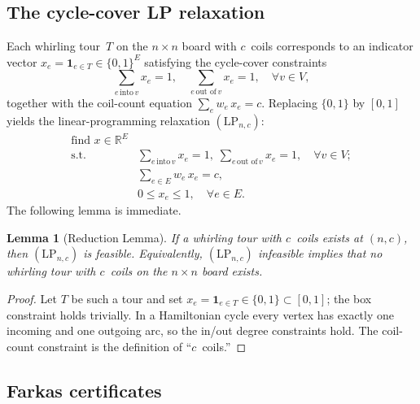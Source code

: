 \documentclass[11pt]{article}
\theoremstyle{plain}
\newtheorem{lemma}{Lemma}
\theoremstyle{remark}
\newcommand{\R}{\mathbb{R}}
\begin{document}
\subsection*{The cycle-cover LP relaxation}

Each whirling tour~$T$ on the $n\times n$ board with $c$~coils
corresponds to an indicator vector $x_e=\mathbf 1_{e\in T}\in\{0,1\}^E$
satisfying the cycle-cover constraints
\[
  \sum_{e\,\text{into}\,v} x_e = 1, \quad
  \sum_{e\,\text{out of}\,v} x_e = 1, \quad \forall v\in V,
\]
together with the coil-count equation $\sum_e w_e\, x_e = c$.
Replacing $\{0,1\}$ by $[0,1]$ yields the linear-programming
relaxation $(\mathrm{LP}_{n,c})$:
\[
\begin{array}{ll}
\text{find } x\in\R^E \\
\text{s.t.} &
  \displaystyle\sum_{e\,\text{into}\,v} x_e = 1,\;
  \displaystyle\sum_{e\,\text{out of}\,v} x_e = 1, \quad \forall v\in V; \\[6pt]
  & \displaystyle\sum_{e\in E} w_e\, x_e = c, \\[6pt]
  & 0\le x_e\le 1, \quad \forall e\in E.
\end{array}
\]
The following lemma is immediate.

\begin{lemma}[Reduction Lemma]\label{lem:red}
If a whirling tour with $c$~coils exists at $(n,c)$, then
$(\mathrm{LP}_{n,c})$ is feasible.  Equivalently,
$(\mathrm{LP}_{n,c})$ infeasible implies that no whirling tour
with $c$~coils on the $n\times n$ board exists.
\end{lemma}

\begin{proof}
Let $T$ be such a tour and set $x_e=\mathbf{1}_{e\in T}\in\{0,1\}\subset[0,1]$;
the box constraint holds trivially.  In a Hamiltonian cycle every
vertex has exactly one incoming and one outgoing arc, so the in/out
degree constraints hold.  The coil-count constraint is the definition
of ``$c$~coils.''
\end{proof}

\subsection*{Farkas certificates}
\end{document}
